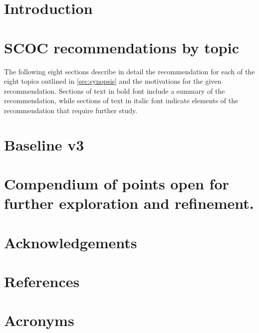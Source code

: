 \section{Introduction}




%
\clearpage

\section{SCOC recommendations by topic}\label{sec:rec}
The following eight sections describe in detail the recommendation for each of the eight topics outlined in \autoref{sec:synopsis} and the motivations for the given recommendation. Sections of text in bold font include a summary of the recommendation, while sections of text in italic font indicate elements of the recommendation that require further study. 


\clearpage

\section{Baseline v3}\label{sec:v3}

\clearpage

\section{Compendium of points open for further exploration and refinement.}
\label{sec:refinements}
\clearpage


\appendix
\section{Acknowledgements}


\section{References} \label{sec:bib}
\renewcommand{\refname}{} %



\section{Acronyms} \label{sec:acronyms}

